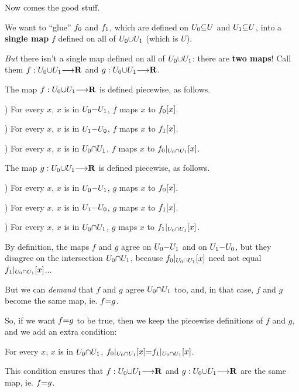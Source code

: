 \vs
Now comes the good stuff. \par
We want to ``glue'' $\g{f_0}$ and $\b{f_1}$, which are defined on $\g{U_0} \p\subseteq U$ and $\b{U_1} \p\subseteq U$, into a {\bf single map} $f$ defined on all of $\g{U_0} \p\cup \b{U_1}$ (which is $U$). \par
{\it But} there isn't a single map defined on all of $\g{U_0} \p\cup \b{U_1}$: there are {\bf two maps}! Call them $f: \g{U_0} \p\cup \b{U_1} \to \R$ and $g: \g{U_0} \p\cup \b{U_1} \to \R$. \par
The map $f: \g{U_0} \p\cup \b{U_1} \to \R$ is defined piecewise, as follows. \par
  ) For every $x$,  $x$ is in $\g{U_0} \p-    \b{U_1}$,  $f$ maps $x$ to $\g{f_0}[x]$. \par
  ) For every $x$,  $x$ is in $\b{U_1} \p-    \g{U_0}$,  $f$ maps $x$ to $\b{f_1}[x]$. \par
  ) For every $x$,  $x$ is in $\g{U_0} \p\cap \b{U_1}$,  $f$ maps $x$ to $\g{f_0}|_{\g{U_0} \p\cap \b{U_1}}[x]$. \par
The map $g: \g{U_0} \p\cup \b{U_1} \to \R$ is defined piecewise, as follows. \par
  ) For every $x$,  $x$ is in $\g{U_0} \p-    \b{U_1}$,  $g$ maps $x$ to $\g{f_0}[x]$. \par
  ) For every $x$,  $x$ is in $\b{U_1} \p-    \g{U_0}$,  $g$ maps $x$ to $\b{f_1}[x]$. \par
  ) For every $x$,  $x$ is in $\g{U_0} \p\cap \b{U_1}$,  $g$ maps $x$ to $\b{f_1}|_{\g{U_0} \p\cap \b{U_1}}[x]$. \par
By definition, the maps $f$ and $g$ agree on $\g{U_0} \p- \b{U_1}$ and on $\b{U_1} \p- \g{U_0}$, but they disagree on the intersection $\g{U_0} \p\cap \b{U_1}$, because $\g{f_0}|_{\g{U_0} \p\cap \b{U_1}}[x]$ need not equal $\b{f_1}|_{\g{U_0} \p\cap \b{U_1}}[x]$... \par
But we can {\it demand} that $f$ and $g$ agree $\g{U_0} \p\cap \b{U_1}$ too, and, in that case, $f$ and $g$ become the same map, ie. $f \p= g$. \par
So, if we want $f \p= g$ to be true, then we keep the piecewise definitions of $f$ and $g$, and we add an extra condition: \par
  \hs For every $x$,  $x$ is in $\g{U_0} \p\cap \b{U_1}$,  $\g{f_0}|_{\g{U_0} \p\cap \b{U_1}}[x] \p= \b{f_1}|_{\g{U_0} \p\cap \b{U_1}}[x]$. \par
This condition ensures that $f: \g{U_0} \p\cup \b{U_1} \to \R$ and $g: \g{U_0} \p\cup \b{U_1} \to \R$ are the same map, ie. $f \p= g$. \par

